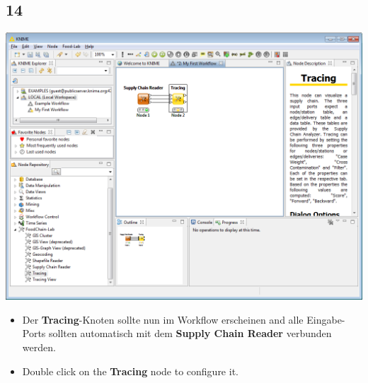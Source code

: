 \documentclass{beamer}
\begin{document}
\subsection{14}
\begin{frame}
	\begin{center}
  		\includegraphics[height=0.6\textheight]{14.png}
	\end{center}
	\begin{itemize}
		\item Der \textbf{Tracing}-Knoten sollte nun im Workflow erscheinen and alle Eingabe-Ports sollten automatisch mit dem \textbf{Supply Chain Reader} verbunden werden.
		\item Double click on the \textbf{Tracing} node to configure it.
	\end{itemize}
\end{frame}
\end{document}
